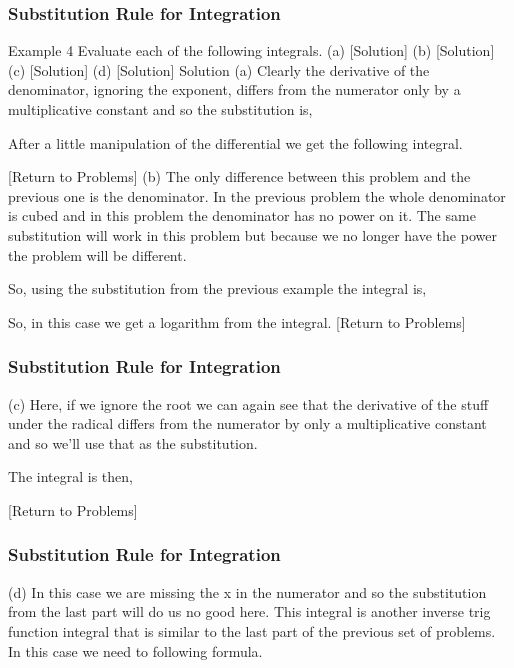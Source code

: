 \documentclass{beamer}
\begin{document}
\begin{frame}
	\frametitle{Substitution Rule for Integration}
	\large
Example 4  Evaluate each of the following integrals.
(a)    [Solution]
(b)    [Solution]
(c)    [Solution]
(d)    [Solution]
Solution
(a) 
Clearly the derivative of the denominator, ignoring the exponent, differs from the numerator only by a multiplicative constant and so the substitution is,
         
 
After a little manipulation of the differential we get the following integral.
                                             
 
 
[Return to Problems]
(b) 
The only difference between this problem and the previous one is the denominator.  In the previous problem the whole denominator is cubed and in this problem the denominator has no power on it.  The same substitution will work in this problem but because we no longer have the power the problem will be different.
 
So, using the substitution from the previous example the integral is,

So, in this case we get a logarithm from the integral.
[Return to Problems]
 \end{frame}
 \begin{frame}
 	\frametitle{Substitution Rule for Integration}
 	\large
(c) 
Here, if we ignore the root we can again see that the derivative of the stuff under the radical differs from the numerator by only a multiplicative constant and so we’ll use that as the substitution.
              
 
The integral is then,
                                               
[Return to Problems]
  \end{frame}
  \begin{frame}
  	\frametitle{Substitution Rule for Integration}
  	\large
(d) 
In this case we are missing the x in the numerator and so the substitution from the last part will do us no good here.  This integral is another inverse trig function integral that is similar to the last part of the previous set of problems.  In this case we need to following formula.
                                                    
 \end{frame}
\end{document}
